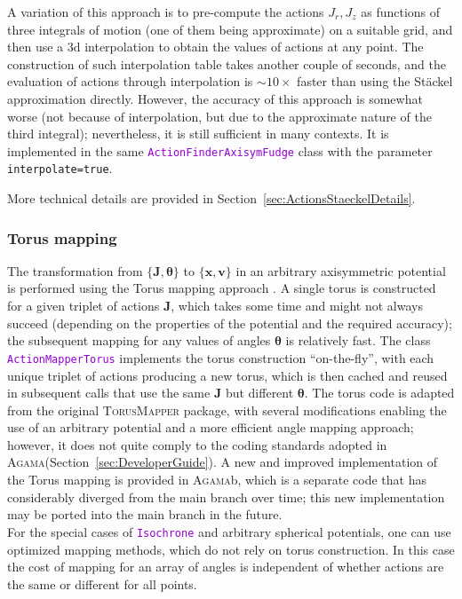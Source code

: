 \documentclass[12pt]{article}
\newcommand{\Agama}{\textsc{Agama}\xspace}
\newcommand{\ttt}[1]{\textcolor{darkviolet}{\texttt{#1}}}
\newcommand{\bv}{\boldsymbol{v}}
\newcommand{\bx}{\boldsymbol{x}}
\newcommand{\bJ}{\boldsymbol{J}}
\newcommand{\bt}{\boldsymbol{\theta}}
\begin{document}
A variation of this approach is to pre-compute the actions $J_r,J_z$ as functions of three integrals of motion (one of them being approximate) on a suitable grid, and then use a 3d interpolation to obtain the values of actions at any point. The construction of such interpolation table takes another couple of seconds, and the evaluation of actions through interpolation is $\sim 10\times$ faster than using the St\"ackel approximation directly. However, the accuracy of this approach is somewhat worse (not because of interpolation, but due to the approximate nature of the third integral); nevertheless, it is still sufficient in many contexts. It is implemented in the same \ttt{ActionFinderAxisymFudge} class with the parameter \texttt{interpolate=true}.

More technical details are provided in Section~\ref{sec:ActionsStaeckelDetails}.


\subsubsection{Torus mapping}  \label{sec:ActionsTorus}

The transformation from $\{\bJ, \bt\}$ to $\{\bx,\bv\}$ in an arbitrary axisymmetric potential is performed using the Torus mapping approach \cite{BinneyMcMillan2016}. A single torus is constructed for a given triplet of actions $\bJ$, which takes some time and might not always succeed (depending on the properties of the potential and the required accuracy); the subsequent mapping for any values of angles $\bt$ is relatively fast.
The class \ttt{ActionMapperTorus} implements the torus construction ``on-the-fly'', with each unique triplet of actions producing a new torus, which is then cached and reused in subsequent calls that use the same $\bJ$ but different $\bt$. The torus code is adapted from the original \textsc{TorusMapper} package, with several modifications enabling the use of an arbitrary potential and a more efficient angle mapping approach; however, it does not quite comply to the coding standards adopted in \Agama (Section~\ref{sec:DeveloperGuide}). A new and improved implementation of the Torus mapping \cite{Binney2026} is provided in \textsc{Agama}b, which is a separate code that has considerably diverged from the main branch over time; this new implementation may be ported into the main branch in the future. \\
For the special cases of \ttt{Isochrone} and arbitrary spherical potentials, one can use optimized mapping methods, which do not rely on torus construction. In this case the cost of mapping for an array of angles is independent of whether actions are the same or different for all points.
\end{document}
